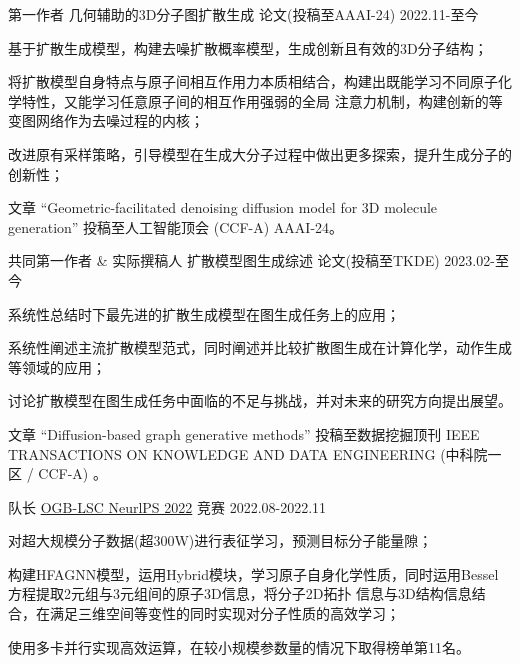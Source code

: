 \begin{cventries}
  
\cventry
{第一作者} %
{几何辅助的3D分子图扩散生成} %
{论文(投稿至AAAI-24)} %
{2022.11-至今} %
{
  \begin{cvitems} 
    \item {基于扩散生成模型，构建去噪扩散概率模型，生成创新且有效的3D分子结构；}
    \item {将扩散模型自身特点与原子间相互作用力本质相结合，构建出既能学习不同原子化学特性，又能学习任意原子间的相互作用强弱的全局
    注意力机制，构建创新的等变图网络作为去噪过程的内核；}
    \item {改进原有采样策略，引导模型在生成大分子过程中做出更多探索，提升生成分子的创新性；}
    \item {文章 “Geometric-facilitated denoising diffusion model for 3D molecule generation” 投稿至人工智能顶会 (CCF-A) AAAI-24。}
  \end{cvitems}
}

\cventry
{共同第一作者 \& 实际撰稿人} %
{扩散模型图生成综述} %
{论文(投稿至TKDE)} %
{2023.02-至今} %
{
  \begin{cvitems} 
    \item {系统性总结时下最先进的扩散生成模型在图生成任务上的应用；}
    \item {系统性阐述主流扩散模型范式，同时阐述并比较扩散图生成在计算化学，动作生成等领域的应用；}
    \item {讨论扩散模型在图生成任务中面临的不足与挑战，并对未来的研究方向提出展望。}
    \item {文章 “Diffusion-based graph generative methods” 投稿至数据挖掘顶刊 IEEE TRANSACTIONS ON KNOWLEDGE AND DATA ENGINEERING (中科院一区 / CCF-A) 。}
\end{cvitems}
}

\cventry
{队长} %
{\href{https://ogb.stanford.edu/neurips2022/results/}{OGB-LSC NeurlPS 2022}} %
{竞赛} %
{2022.08-2022.11} %
{
  \begin{cvitems} %
    \item {对超大规模分子数据(超300W)进行表征学习，预测目标分子能量隙；}
    \item {构建HFAGNN模型，运用Hybrid模块，学习原子自身化学性质，同时运用Bessel方程提取2元组与3元组间的原子3D信息，将分子2D拓扑
    信息与3D结构信息结合，在满足三维空间等变性的同时实现对分子性质的高效学习；}
    \item {使用多卡并行实现高效运算，在较小规模参数量的情况下取得榜单第11名。}
  \end{cvitems}
}


\end{cventries}
